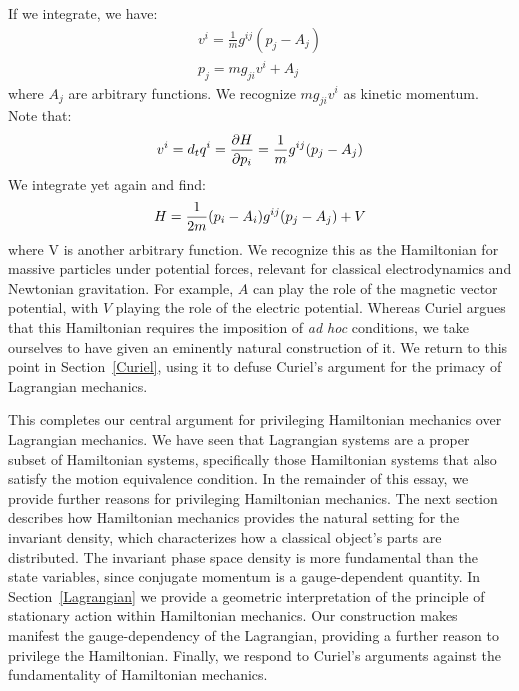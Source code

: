 \documentclass[12pt, english, twoside]{article} %
\begin{document}
If we integrate, we have:
\begin{equation} \label{linear_relationship}
\begin{aligned}
v^i = \frac{1}{m} g^{ij}(p_j - A_j) \\
p_j = m g_{ji} v^i + A_j
\end{aligned}
\end{equation}
where $A_j$ are arbitrary functions. We recognize $m g_{ji} v^i$ as kinetic momentum. Note that:
\begin{equation}
v^i = d_t q^i = \frac{\partial H }{\partial p_i} = \frac{1}{m} g^{ij}(p_j - A_j) \\
\end{equation}
We integrate yet again and find:
\begin{equation} \label{massive_Hamiltonian}
H = \frac{1}{2m} (p_i - A_i) g^{ij}(p_j - A_j) + V \\
\end{equation}
where V is another arbitrary function. We recognize this as the Hamiltonian for massive particles under potential forces, relevant for classical electrodynamics and Newtonian gravitation. For example, $A$ can play the role of the magnetic vector potential, with $V$ playing the role of the electric potential. Whereas Curiel \parencites*[]{Curiel} argues that this Hamiltonian requires the imposition of \textit{ad hoc} conditions, we take ourselves to have given an eminently natural construction of it. We return to this point in Section~\ref{Curiel}, using it to defuse Curiel's argument for the primacy of Lagrangian mechanics.

This completes our central argument for privileging Hamiltonian mechanics over Lagrangian mechanics. We have seen that Lagrangian systems are a proper subset of Hamiltonian systems, specifically those Hamiltonian systems that also satisfy the motion equivalence condition. In the remainder of this essay, we provide further reasons for privileging Hamiltonian mechanics. The next section describes how Hamiltonian mechanics provides the natural setting for the invariant density, which characterizes how a classical object's parts are distributed. The invariant phase space density is more fundamental than the state variables, since conjugate momentum is a gauge-dependent quantity. In Section~\ref{Lagrangian} we provide a geometric interpretation of the principle of stationary action within Hamiltonian mechanics. Our construction makes manifest the gauge-dependency of the Lagrangian, providing a further reason to privilege the Hamiltonian. Finally, we respond to Curiel's arguments against the fundamentality of Hamiltonian mechanics.
\end{document}
